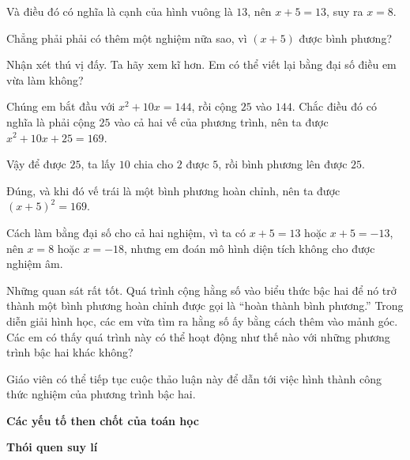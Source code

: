 {\begin{scriptlist}
    \item [Học sinh 1:] Và điều đó có nghĩa là cạnh của hình vuông là $13$, nên $x + 5 = 13$, suy ra $x = 8$.

    \item [Học sinh 2:] Chẳng phải phải có thêm một nghiệm nữa sao, vì $(x + 5)$ được bình phương?

    \item [Giáo viên:] Nhận xét thú vị đấy. Ta hãy xem kĩ hơn. Em có thể viết lại bằng đại số điều em vừa làm không?

    \item [Học sinh 2:] Chúng em bắt đầu với $x^2 + 10x = 144$, rồi cộng $25$ vào $144$. Chắc điều đó có nghĩa là phải cộng $25$ vào cả hai vế của phương trình, nên ta được $x^2 + 10x + 25 = 169$.

    \item [Học sinh 1:] Vậy để được $25$, ta lấy $10$ chia cho $2$ được $5$, rồi bình phương lên được $25$.

    \item [Học sinh 2:] Đúng, và khi đó vế trái là một bình phương hoàn chỉnh, nên ta được $(x + 5)^2 = 169$.

    \item [Học sinh 1:] Cách làm bằng đại số cho cả hai nghiệm, vì ta có $x + 5 = 13$ hoặc $x + 5 = -13$, nên $x = 8$ hoặc $x = -18$, nhưng em đoán mô hình diện tích không cho được nghiệm âm.

    \item [Giáo viên:] Những quan sát rất tốt. Quá trình cộng hằng số vào biểu thức bậc hai để nó trở thành một bình phương hoàn chỉnh được gọi là ``hoàn thành bình phương.'' Trong diễn giải hình học, các em vừa tìm ra hằng số ấy bằng cách thêm vào mảnh góc. Các em có thấy quá trình này có thể hoạt động như thế nào với những phương trình bậc hai khác không?
    \end{scriptlist}

    Giáo viên có thể tiếp tục cuộc thảo luận này để dẫn tới việc hình thành công thức nghiệm của phương trình bậc hai.

    \textbf{Các yếu tố then chốt của toán học}

    \begin{hanglist}
      \vspace{\baselineskip}
    \end{hanglist}

    \textbf{Thói quen suy lí}

    \begin{hanglist}
      \vspace{\baselineskip}


    \end{hanglist}
  }
